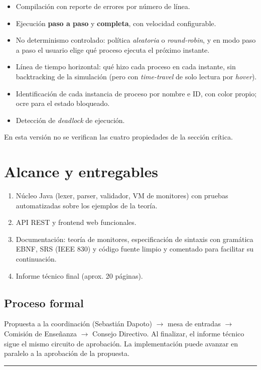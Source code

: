 \documentclass[11pt,a4paper]{article}
\begin{document}
\begin{itemize}[leftmargin=1.4em]
  \item Compilación con reporte de errores por número de línea.
  \item Ejecución \textbf{paso a paso} y \textbf{completa}, con velocidad configurable.
  \item No determinismo controlado: política \emph{aleatoria} o \emph{round-robin}, y en modo
        paso a paso el usuario elige qué proceso ejecuta el próximo instante.
  \item Línea de tiempo horizontal: qué hizo cada proceso en cada instante, sin backtracking
        de la simulación (pero con \emph{time-travel} de solo lectura por \emph{hover}).
  \item Identificación de cada instancia de proceso por nombre e ID, con color propio; ocre
        para el estado bloqueado.
  \item Detección de \emph{deadlock} de ejecución.
\end{itemize}

En esta versión no se verifican las cuatro propiedades de la sección crítica.

\section{Alcance y entregables}

\begin{enumerate}[leftmargin=1.4em]
  \item Núcleo Java (lexer, parser, validador, VM de monitores) con pruebas automatizadas
        sobre los ejemplos de la teoría.
  \item API REST y frontend web funcionales.
  \item Documentación: teoría de monitores, especificación de sintaxis con gramática EBNF,
        SRS (IEEE 830) y código fuente limpio y comentado para facilitar su continuación.
  \item Informe técnico final (aprox. 20 páginas).
\end{enumerate}

\subsection{Proceso formal}

Propuesta a la coordinación (Sebastián Dapoto) $\rightarrow$ mesa de entradas $\rightarrow$
Comisión de Enseñanza $\rightarrow$ Consejo Directivo. Al finalizar, el informe técnico
sigue el mismo circuito de aprobación. La implementación puede avanzar en paralelo a la
aprobación de la propuesta.

\vspace{1.5em}
\hrule
\end{document}
